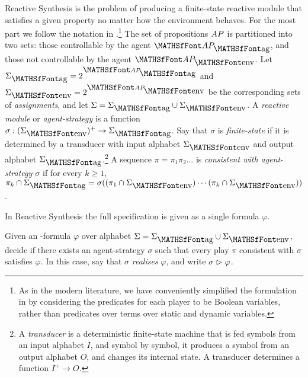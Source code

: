 Reactive Synthesis is the problem of producing a finite-state reactive module that satisfies a given property no matter how the environment behaves. 
For the most part we follow the notation in \cite{PnRo89}.\footnote{As in the modern literature, %
we have conveniently simplified the formulation in \cite{PnRo89} by considering the predicates for each player to be Boolean variables, rather than predicates over terms over static and dynamic variables.} The set of propositions ${AP}$ is partitioned into two sets: those controllable by the agent $\apa$, and those not controllable by the agent $\ape$.
Let $\Sigma_{{\ag}} = 2^{\apa}$ and $\Sigma_{{\env}} = 2^{\ape}$ be the corresponding sets of {\em assignments}, and let $\Sigma = \Sigma_{\ag} \cup \Sigma_{\env}$.
A {\em reactive module} or \emph{agent-strategy} is a function $\sigma:(\Sigma_{\env})^+ \to \Sigma_{\ag}$. Say that $\sigma$ is {\em finite-state} if it is determined by a transducer with input alphabet $\Sigma_{\env}$ and output alphabet $\Sigma_{\ag}$.\footnote{A \emph{transducer} is a deterministic finite-state machine that is fed symbols from an input alphabet $I$, and symbol by symbol, it produces a symbol from an output alphabet $O$, and changes its internal state. A transducer determines a function $I^+ \to O$. 
}
A sequence $\pi = \pi_1 \pi_2 \dots$ is {\em consistent with agent-strategy $\sigma$} if for every $k \geq 1$, 
  $\pi_{k} \cap \Sigma_{\ag} = \sigma((\pi_1 \cap \Sigma_{\env}) \cdots (\pi_k \cap \Sigma_{\env}))$.
 





In \LTL Reactive Synthesis the full specification is given as a single \LTL formula $\varphi$.

\begin{definition}
Given an \LTL-formula $\varphi$ over alphabet $\Sigma = \Sigma_{\ag} \cup \Sigma_{\env}$, decide if there exists an agent-strategy 
$\sigma$ such that every play $\pi$ consistent with $\sigma$ satisfies $\varphi$. In this case, say that $\sigma$ \emph{realises} $\varphi$, and write 
$\sigma \vartriangleright \varphi$.
\end{definition}


